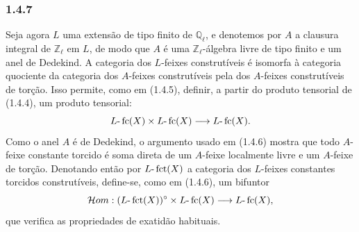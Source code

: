 \subsubsection*{1.4.7}
Seja agora \(L\) uma extensão de tipo finito de \(\mathbb Q_\ell\), e denotemos por \(A\) a clausura integral de \(\mathbb Z_\ell\) em \(L\), de modo que \(A\) é uma \(\mathbb Z_\ell\)-álgebra livre de tipo finito e um anel de Dedekind. A categoria dos \(L\)-feixes construtíveis é isomorfa à categoria quociente da categoria dos \(A\)-feixes construtíveis pela dos \(A\)-feixes construtíveis de torção. Isso permite, como em (1.4.5), definir, a partir do produto tensorial de (1.4.4), um produto tensorial:
\[
L\text{-}\operatorname{fc}(X)\times L\text{-}\operatorname{fc}(X)\longrightarrow L\text{-}\operatorname{fc}(X).
\]
Como o anel \(A\) é de Dedekind, o argumento usado em (1.4.6) mostra que todo \(A\)-feixe constante torcido é soma direta de um \(A\)-feixe localmente livre e um \(A\)-feixe de torção. Denotando então por \(L\text{-}\operatorname{fct}(X)\) a categoria dos \(L\)-feixes constantes torcidos construtíveis, define-se, como em (1.4.6), um bifuntor
\[
\mathcal{H}om:(L\text{-}\operatorname{fct}(X))^\circ\times L\text{-}\operatorname{fc}(X)
\longrightarrow L\text{-}\operatorname{fc}(X),
\]
que verifica as propriedades de exatidão habituais.
